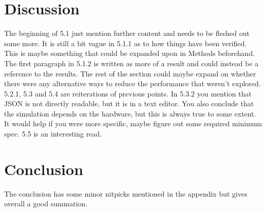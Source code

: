 \documentclass[12pt,a4paper,twoside,openright]{report}
\begin{document}
\section*{Discussion}

	The beginning of 5.1 just mention further content and needs to be fleshed 
	out	some more. It is still a bit vague in 5.1.1 as to how things have been
	verified. This is maybe something that could be expanded upon in Methods
	beforehand. The first paragraph in 5.1.2 is written as more of a result and
	could instead be a reference to the results. The rest of the section could
	maybe expand on whether there were any alternative ways to reduce the
	performance that weren't explored. 5.2.1, 5.3 and 5.4 are reiterations of
	previous points. In 5.3.2 you mention that JSON is not directly readable, 
	but it is in a text editor. You also conclude that the simulation depends 
	on the hardware, but this is always true to some extent. It would help if 
	you were more specific, maybe figure out some required minimum spec. 5.5 is 
	an interesting read.

\section*{Conclusion}

	The conclusion has some minor nitpicks mentioned in the appendix but gives
	overall a good summation.
\end{document}
